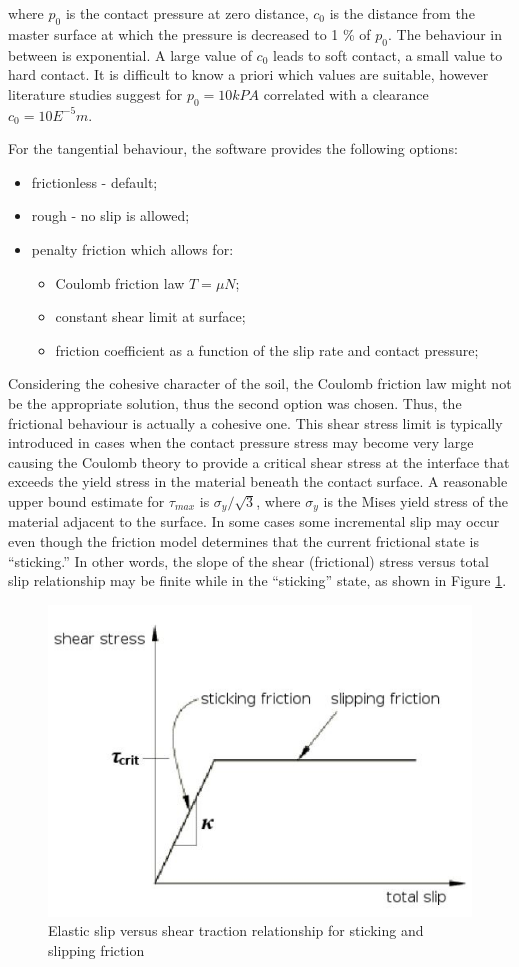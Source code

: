 where $p_0$ is the contact pressure at zero distance, $ c_0$ is the distance from the master surface at which the pressure is decreased to 1 \% of $ p_0$. The behaviour in between is exponential. A large value of $ c_0$ leads to soft contact, a small value to hard contact. It is difficult to know a priori which values are suitable, however literature studies suggest for $p_0=10 kPA$ correlated with a clearance $c_0=10E^{-5} m$.


For the tangential behaviour, the software provides the following options:
\begin{itemize}
	\item frictionless - default;
	\item rough - no slip is allowed;
	\item penalty friction which allows for:
		\begin{itemize}
			\item Coulomb friction law $T=\mu N$;
			\item constant shear limit at surface;
			\item friction coefficient as a function of the slip rate and contact pressure;
		\end{itemize}
\end{itemize}

Considering the cohesive character of the soil, the Coulomb friction law might not be the appropriate solution, thus the second option was chosen. Thus, the frictional behaviour is actually a cohesive one. This shear stress limit is typically introduced in cases when the contact pressure stress may become very large causing the Coulomb theory to provide a critical shear stress at the interface that exceeds the yield stress in the material beneath the contact surface. A reasonable upper bound estimate for $\tau_{max}$ is $\sigma_y/\sqrt{3}$, where $\sigma_y$ is the Mises yield stress of the material adjacent to the surface. In some cases some incremental slip may occur even though the friction model determines that the current frictional state is “sticking.” In other words, the slope of the shear (frictional) stress versus total slip relationship may be finite while in the “sticking” state, as shown in Figure \ref{stick}.

\begin{figure}[!h]
	\centering
	\includegraphics[width=0.5\linewidth]{"stick"}
	\caption{Elastic slip versus shear traction relationship for sticking and slipping friction}
	\label{stick}
\end{figure} 

